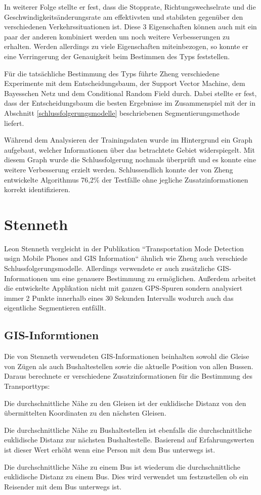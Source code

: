In weiterer Folge stellte er fest, dass die Stopprate, Richtungswechselrate und die Geschwindigkeitsänderungsrate am effektivsten und stabilsten gegenüber den verschiedenen Verkehrssituationen ist. Diese 3 Eigenschaften können auch mit ein paar der anderen kombiniert werden um noch weitere Verbesserungen zu erhalten. Werden allerdings zu viele Eigenschaften miteinbezogen, so konnte er eine Verringerung der Genauigkeit beim Bestimmen des Typs feststellen. 

Für die tatsächliche Bestimmung des Typs führte Zheng verschiedene Experimente mit dem Entscheidungsbaum, der Support Vector Machine, dem Bayesschen Netz und dem Conditional Random Field durch. Dabei stellte er fest, dass der Entscheidungsbaum die besten Ergebnisse im Zusammenspiel mit der in Abschnitt \ref{schlussfolgerungsmodelle} beschriebenen Segmentierungsmethode liefert. 

Während dem Analysieren der Trainingsdaten wurde im Hintergrund ein Graph aufgebaut, welcher Informationen über das betrachtete Gebiet widerspiegelt. Mit diesem Graph wurde die Schlussfolgerung nochmals überprüft und es konnte eine weitere Verbesserung erzielt werden. Schlussendlich konnte der von Zheng entwickelte Algorithmus 76,2\% der Testfälle ohne jegliche Zusatzinformationen korrekt identifizieren.

\section{Stenneth}
Leon Stenneth vergleicht in der Publikation ``Transportation Mode Detection usign Mobile Phones and GIS Information`` ähnlich wie Zheng auch verschiede Schlussfolgerungsmodelle. Allerdings verwendete er auch zusätzliche GIS-Informationen um eine genauere Bestimmung zu ermöglichen. Außerdem arbeitet die entwickelte Applikation nicht mit ganzen GPS-Spuren sondern analysiert immer 2 Punkte innerhalb eines 30 Sekunden Intervalls wodurch auch das eigentliche Segmentieren entfällt.

\subsection{GIS-Informtionen}
Die von Stenneth verwendeten GIS-Informationen beinhalten sowohl die Gleise von Zügen als auch Bushaltestellen sowie die aktuelle Position von allen Bussen. Daraus berechnete er verschiedene Zusatzinformationen für die Bestimmung des Transporttyps:
\begin{pitemize}
\item Die durchschnittliche Nähe zu den Gleisen ist der euklidische Distanz von den übermittelten Koordinaten zu den nächsten Gleisen. 
\item Die durchschnittliche Nähe zu Bushaltestellen ist ebenfalls die durchschnittliche euklidische Distanz zur nächsten Bushaltestelle. Basierend auf Erfahrungswerten ist dieser Wert erhöht wenn eine Person mit dem Bus unterwegs ist.
\item Die durchschnittliche Nähe zu einem Bus ist wiederum die durchschnittliche euklidische Distanz zu einem Bus. Dies wird verwendet um festzustellen ob ein Reisender mit dem Bus unterwegs ist.
\end{pitemize}


